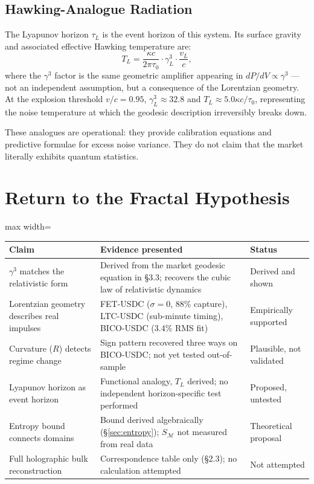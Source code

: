 \documentclass[12pt,a4paper]{article}
\begin{document}
\subsection{Hawking-Analogue Radiation}

The Lyapunov horizon $\tau_L$ is the event horizon of this system. Its
surface gravity and associated effective Hawking temperature are:
\begin{equation}
    T_L = \frac{\kappa c}{2\pi\tau_0}\cdot\gamma_L^3\cdot\frac{v_L}{c},
\end{equation}
where the $\gamma^3$ factor is the same geometric amplifier appearing in
$dP/dV\propto\gamma^3$ --- not an independent assumption, but a
consequence of the Lorentzian geometry. At the explosion threshold
$v/c=0.95$, $\gamma_L^3\approx32.8$ and $T_L\approx5.0\kappa c/\tau_0$,
representing the noise temperature at which the geodesic description
irreversibly breaks down.

These analogues are operational: they provide calibration equations and
predictive formulae for excess noise variance. They do not claim that
the market literally exhibits quantum statistics.


\section{Return to the Fractal Hypothesis}

\begin{center}
\begin{adjustbox}{max width=\textwidth}
\begin{tabular}{p{3.5cm}p{5.5cm}p{3.5cm}}
\toprule
Claim & Evidence presented & Status \\
\midrule
$\gamma^3$ matches the relativistic form &
  Derived from the market geodesic equation in \S3.3;
  recovers the cubic law of relativistic dynamics &
  Derived and shown \\
Lorentzian geometry describes real impulses &
  FET-USDC ($\sigma=0$, 88\% capture),
  LTC-USDC (sub-minute timing),
  BICO-USDC (3.4\% RMS fit) &
  Empirically supported \\
Curvature ($R$) detects regime change &
  Sign pattern recovered three ways on BICO-USDC;
  not yet tested out-of-sample &
  Plausible, not validated \\
Lyapunov horizon as event horizon &
  Functional analogy, $T_L$ derived;
  no independent horizon-specific test performed &
  Proposed, untested \\
Entropy bound connects domains &
  Bound derived algebraically (\S\ref{sec:entropy});
  $S_{\mathcal{M}}$ not measured from real data &
  Theoretical proposal \\
Full holographic bulk reconstruction &
  Correspondence table only (\S2.3);
  no calculation attempted &
  Not attempted \\
\bottomrule
\end{tabular}
\end{adjustbox}
\end{center}
\end{document}

